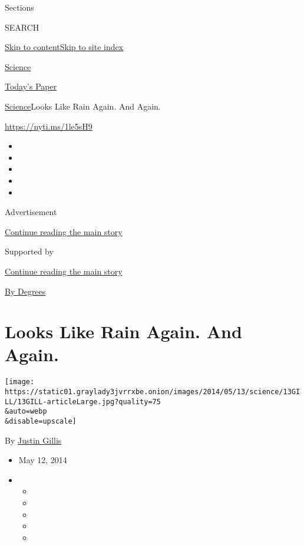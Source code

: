 Sections

SEARCH

\protect\hyperlink{site-content}{Skip to
content}\protect\hyperlink{site-index}{Skip to site index}

\href{https://www.nytimes3xbfgragh.onion/section/science}{Science}

\href{https://myaccount.nytimes3xbfgragh.onion/auth/login?response_type=cookie\&client_id=vi}{}

\href{https://www.nytimes3xbfgragh.onion/section/todayspaper}{Today's
Paper}

\href{/section/science}{Science}\textbar{}Looks Like Rain Again. And
Again.

\url{https://nyti.ms/1le5sH9}

\begin{itemize}
\item
\item
\item
\item
\item
\end{itemize}

Advertisement

\protect\hyperlink{after-top}{Continue reading the main story}

Supported by

\protect\hyperlink{after-sponsor}{Continue reading the main story}

\href{/column/by-degrees}{By Degrees}

\hypertarget{looks-like-rain-again-and-again}{%
\section{Looks Like Rain Again. And
Again.}\label{looks-like-rain-again-and-again}}

\texttt{[image: https://static01.graylady3jvrrxbe.onion/images/2014/05/13/science/13GILL/13GILL-articleLarge.jpg?quality=75\\\&auto=webp\\\&disable=upscale]}

By \href{http://www.nytimes3xbfgragh.onion/by/justin-gillis}{Justin
Gillis}

\begin{itemize}
\item
  May 12, 2014
\item
  \begin{itemize}
  \item
  \item
  \item
  \item
  \item
  \end{itemize}
\end{itemize}

